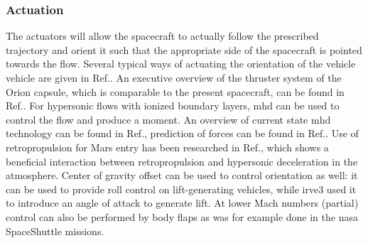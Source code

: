 \subsubsection{Actuation}
The actuators will allow the spacecraft to actually follow the prescribed trajectory and orient it such that the appropriate side of the spacecraft is pointed towards the flow. Several typical ways of actuating the orientation of the vehicle vehicle are given in Ref.\cite{Wertz2011}. An executive overview of the thruster system of the Orion capsule, which is comparable to the present spacecraft, can be found in Ref.\cite{Jones2012}. For hypersonic flows with ionized boundary layers, \gls{mhd} can be used to control the flow and produce a moment. An overview of current state \gls{mhd} technology can be found in Ref.\cite{Braun2009}, prediction of forces can be found in Ref.\cite{Kawamura2013}. Use of retropropulsion for Mars entry has been researched in Ref.\cite{Nise2011}, which shows a beneficial interaction between retropropulsion and hypersonic deceleration in the atmosphere. Center of gravity offset can be used to control orientation as well: it can be used to provide roll control on lift-generating vehicles\cite{Petsopoulos1996}, while \gls{irve3} used it to introduce an angle of attack to generate lift.\cite{Dillman2012a} At lower Mach numbers (partial) control can also be performed by body flaps as was for example done in the \gls{nasa} SpaceShuttle missions.